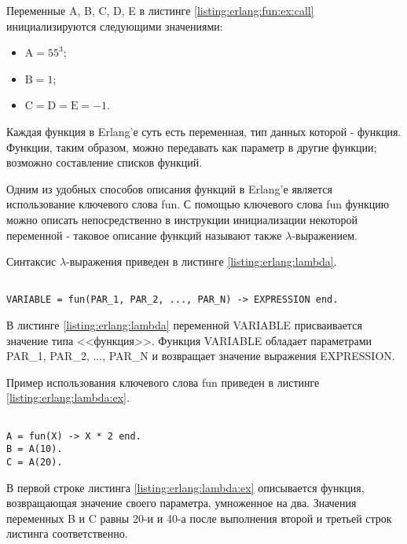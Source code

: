 Переменные A, B, C, D, E в листинге \ref{listing:erlang:fun:ex:call} инициализируются следующими значениями:

\begin{itemize}

	\item $\text{A} = 55^3$;
	\item $\text{B} = 1$;
	\item $\text{C} = \text{D} = \text{E} = -1$.

\end{itemize}


Каждая функция в Erlang'е суть есть переменная, тип данных которой - функция. Функции, таким образом, можно передавать как параметр в другие функции; возможно составление списков функций.

Одним из удобных способов описания функций в Erlang'е является использование ключевого слова fun. С помощью ключевого слова fun функцию можно описать непосредственно в инструкции инициализации некоторой переменной - таковое описание функций называют также $\lambda$-выражением.

Синтаксис $\lambda$-выражения приведен в листинге \ref{listing:erlang:lambda}.

\begin{lstlisting}

VARIABLE = fun(PAR_1, PAR_2, ..., PAR_N) -> EXPRESSION end.

\end{lstlisting}
\mylistingend

В листинге \ref{listing:erlang:lambda} переменной VARIABLE присваивается значение типа <<функция>>. Функция VARIABLE обладает параметрами PAR\_1, PAR\_2, ..., PAR\_N и возвращает значение выражения EXPRESSION.

Пример использования ключевого слова fun приведен в листинге \ref{listing:erlang:lambda:ex}.

\begin{lstlisting}

A = fun(X) -> X * 2 end.
B = A(10).
C = A(20).

\end{lstlisting}
\mylistingend

В первой строке листинга \ref{listing:erlang:lambda:ex} описывается функция, возвращающая значение своего параметра, умноженное на два. Значения переменных B и C равны 20-и и 40-а после выполнения второй и третьей строк листинга соответственно.

